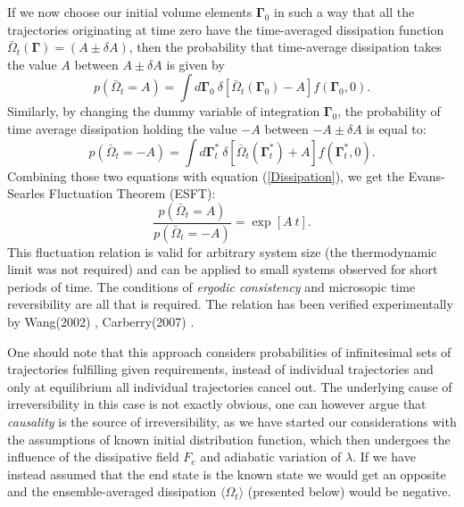 \documentclass[a4paper,12pt]{article}
\begin{document}
If we now choose our initial volume elements $\bm{\Gamma}_0$ in such a way that all the trajectories originating at time zero have the time-averaged dissipation function $\bar{\Omega}_t(\bm{\Gamma})=(A \pm \delta A)$, then the probability that time-average dissipation takes the value $A$ between $A\pm \delta A$ is given by 
\begin{equation}
  p(\bar{\Omega}_t =A)=\int d\bm{\Gamma}_0\ \delta[\bar{\Omega}_t(\bm{\Gamma}_0)-A]f(\bm{\Gamma}_0,0).
\end{equation}
Similarly, by changing the dummy variable of integration $\bm{\Gamma}_0$, the probability of time average dissipation holding the value $-A$ between $-A\pm \delta A$ is equal to:
\begin{equation}
  p(\bar{\Omega}_t =-A)=\int d\bm{\Gamma}_t^*\ \delta[\bar{\Omega}_t(\bm{\Gamma}_t^*)+A]f(\bm{\Gamma}_t^*,0).
\end{equation}
Combining those two equations with equation (\ref{Dissipation}), we get the Evans-Searles Fluctuation Theorem (ESFT):
\begin{equation}
\label{ESFT}
  \frac{p(\bar{\Omega}_t=A)}{p(\bar{\Omega}_t=-A)}=\exp[A\ t].
\end{equation}
This fluctuation relation is valid for arbitrary system size (the thermodynamic limit was not required) and can be applied to small systems observed for short periods of time. The conditions of \textit{ergodic consistency} and microsopic time reversibility are all that is required.
The relation has been verified experimentally by Wang(2002) \cite{Wang:2002hw}, Carberry(2007) \cite{Carberry:2007be}.

One should note that this approach considers probabilities of infinitesimal sets of trajectories fulfilling given requirements, instead of individual trajectories and only at equilibrium all individual trajectories cancel out.
The underlying cause of irreversibility in this case is not exactly obvious, one can however argue \cite{Evans:2241458} that \textit{causality} is the source of irreversibility, as we have started our considerations with the assumptions of known initial distribution function, which then undergoes the influence of the dissipative field $F_e$ and adiabatic variation of $\lambda$. If we have instead assumed that the end state is the known state we would get an opposite and the ensemble-averaged dissipation $\langle \Omega_t \rangle$ (presented below) would be negative.
\end{document}
